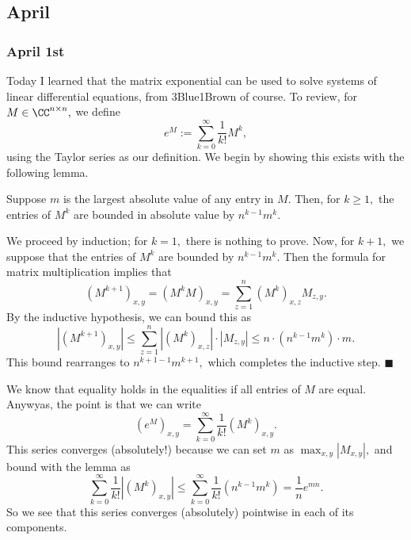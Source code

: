 \subsection{April}

\subsubsection{April 1st}
Today I learned that the matrix exponential can be used to solve systems of linear differential equations, from 3Blue1Brown of course. To review, for $M\in\CC^{n\times n},$ we define
\[e^M:=\sum_{k=0}^\infty\frac1{k!}M^k,\]
using the Taylor series as our definition. We begin by showing this exists with the following lemma.
\begin{lemma}
    Suppose $m$ is the largest absolute value of any entry in $M.$ Then, for $k\ge1,$ the entries of $M^k$ are bounded in absolute value by $n^{k-1}m^k.$
\end{lemma}
We proceed by induction; for $k=1,$ there is nothing to prove. Now, for $k+1,$ we suppose that the entries of $M^k$ are bounded by $n^{k-1}m^k.$ Then the formula for matrix multiplication implies that
\[\left(M^{k+1}\right)_{x,y}=\left(M^kM\right)_{x,y}=\sum_{z=1}^n\left(M^k\right)_{x,z}M_{z,y}.\]
By the inductive hypothesis, we can bound this as
\[\left|\left(M^{k+1}\right)_{x,y}\right|\le\sum_{z=1}^n\left|\left(M^k\right)_{x,z}\right|\cdot\left|M_{z,y}\right|\le n\cdot\left(n^{k-1}m^k\right)\cdot m.\]
This bound rearranges to $n^{k+1-1}m^{k+1},$ which completes the inductive step. $\blacksquare$

We know that equality holds in the equalities if all entries of $M$ are equal. Anywyas, the point is that we can write
\[\left(e^M\right)_{x,y}=\sum_{k=0}^\infty\frac1{k!}\left(M^k\right)_{x,y}.\]
This series converges (absolutely!) because we can set $m$ as $\max_{x,y}|M_{x,y}|,$ and bound with the lemma as
\[\sum_{k=0}^\infty\frac1{k!}\left|\left(M^k\right)_{x,y}\right|\le\sum_{k=0}^\infty\frac1{k!}\left(n^{k-1}m^k\right)=\frac1ne^{mn}.\]
So we see that this series converges (absolutely) pointwise in each of its components.

